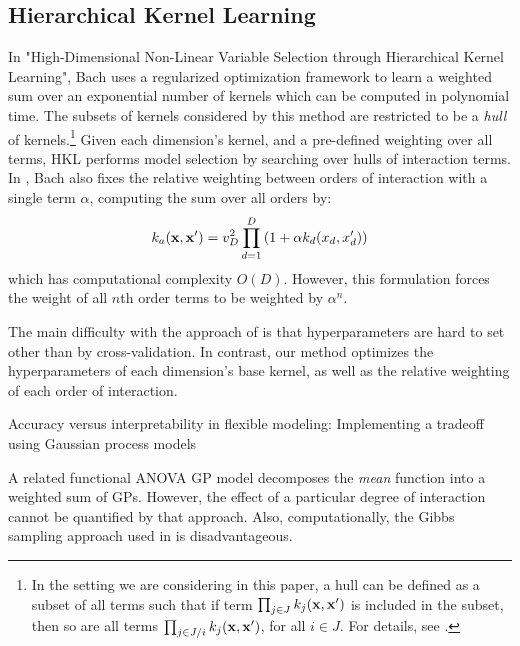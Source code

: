 \documentclass[twoside]{article}
\begin{document}
\subsection{Hierarchical Kernel Learning}

In "High-Dimensional Non-Linear Variable Selection through Hierarchical Kernel Learning", Bach\cite{DBLP:journals/corr/abs-0909-0844} uses a regularized optimization framework to learn a weighted sum over an exponential number of kernels which can be computed in polynomial time.  The subsets of kernels considered by this method are restricted to be a \textit{hull} of kernels.\footnote{In the setting we are considering in this paper, a hull can be defined as a subset of all terms such that if term $\prod_{j \in J} k_j(\bf x, x')$ is included in the subset, then so are all terms $\prod_{j \in J / i} k_j(\bf x, x')$, for all $i \in J$.  For details, see \cite{DBLP:journals/corr/abs-0909-0844}.}
Given each dimension's kernel, and a pre-defined weighting over all terms, HKL performs model selection by searching over hulls of interaction terms.
In \cite{DBLP:journals/corr/abs-0909-0844}, Bach also fixes the relative weighting between orders of interaction with a single term $\alpha$, computing the sum over all orders by:
\begin{equation}
\label{eqn:uniform}
k_{a}({\bf x, x'}) = v_D^2 \prod_{d=1}^D \left(1 + \alpha k_{d}(x_{d}, x_{d}') \right)
\end{equation}
which has computational complexity $O(D)$.  However, this formulation forces the weight of all $n$th order terms to be weighted by $\alpha^n$.

The main difficulty with the approach of \cite{DBLP:journals/corr/abs-0909-0844} is that hyperparameters are hard to set other than by cross-validation.  In contrast, our method optimizes the hyperparameters of each dimension's base kernel, as well as the relative weighting of each order of interaction. 

Accuracy versus interpretability in flexible modeling: Implementing a tradeoff using Gaussian process models \cite{plate1999accuracy}

A related functional ANOVA GP model\cite{kaufman2010bayesian} decomposes the \emph{mean} function into a weighted sum of GPs. However, the effect of a particular degree of interaction cannot be quantified by that approach. Also, computationally, the Gibbs sampling approach used in \cite{kaufman2010bayesian} is disadvantageous.
\end{document}
